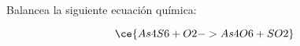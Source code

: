 Balancea la siguiente ecuación química:

\[
    \ce{As4S6 + O2 -> As4O6 + SO2}
\]

\begin{solutionbox}{5cm}

\end{solutionbox}